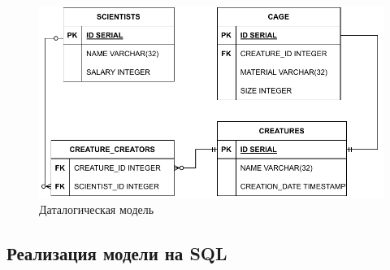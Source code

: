 \clearpage
\begin{figure}[ht]
    \centering
    \includegraphics[width=\textwidth]{img/datalogical.pdf}
    \caption{Даталогическая модель}
\end{figure}

\subsection{Реализация модели на SQL}
\inputminted{SQL}{../scheme.sql}
